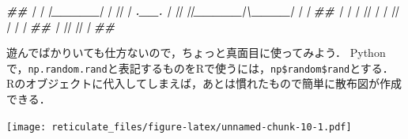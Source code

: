 \documentclass[
]{article}
\newenvironment{Shaded}{\begin{snugshade}}{\end{snugshade}}
\newcommand{\CommentTok}[1]{\textcolor[rgb]{0.56,0.35,0.01}{\textit{#1}}}
\newcommand{\DecValTok}[1]{\textcolor[rgb]{0.00,0.00,0.81}{#1}}
\newcommand{\DocumentationTok}[1]{\textcolor[rgb]{0.56,0.35,0.01}{\textbf{\textit{#1}}}}
\newcommand{\FunctionTok}[1]{\textcolor[rgb]{0.00,0.00,0.00}{#1}}
\newcommand{\NormalTok}[1]{#1}
\newcommand{\OtherTok}[1]{\textcolor[rgb]{0.56,0.35,0.01}{#1}}
\newcommand{\SpecialCharTok}[1]{\textcolor[rgb]{0.00,0.00,0.00}{#1}}
\newcommand{\StringTok}[1]{\textcolor[rgb]{0.31,0.60,0.02}{#1}}
\begin{document}
\begin{Shaded}
\begin{Highlighting}[]
\DocumentationTok{\#\# | | |\_\_\_\_\_|      | || |    \textasciigrave{}.\_\_.\textquotesingle{}    | || ||\_\_\_\_\_|\textbackslash{}\_\_\_\_| | |}
\DocumentationTok{\#\# | |              | || |              | || |              | |}
\DocumentationTok{\#\# | \textquotesingle{}{-}{-}{-}{-}{-}{-}{-}{-}{-}{-}{-}{-}{-}{-}\textquotesingle{} || \textquotesingle{}{-}{-}{-}{-}{-}{-}{-}{-}{-}{-}{-}{-}{-}{-}\textquotesingle{} || \textquotesingle{}{-}{-}{-}{-}{-}{-}{-}{-}{-}{-}{-}{-}{-}{-}\textquotesingle{} |}
\DocumentationTok{\#\#  \textquotesingle{}{-}{-}{-}{-}{-}{-}{-}{-}{-}{-}{-}{-}{-}{-}{-}{-}\textquotesingle{}  \textquotesingle{}{-}{-}{-}{-}{-}{-}{-}{-}{-}{-}{-}{-}{-}{-}{-}{-}\textquotesingle{}  \textquotesingle{}{-}{-}{-}{-}{-}{-}{-}{-}{-}{-}{-}{-}{-}{-}{-}{-}\textquotesingle{} }
\end{Highlighting}
\end{Shaded}

遊んでばかりいても仕方ないので，ちょっと真面目に使ってみよう．
Pythonで，\texttt{np.random.rand}と表記するものをRで使うには，\texttt{np\$random\$rand}とする．
Rのオブジェクトに代入してしまえば，あとは慣れたもので簡単に散布図が作成できる．

\begin{Shaded}
\end{Shaded}

\texttt{[image: reticulate\_files/figure-latex/unnamed-chunk-10-1.pdf]}
\end{document}
